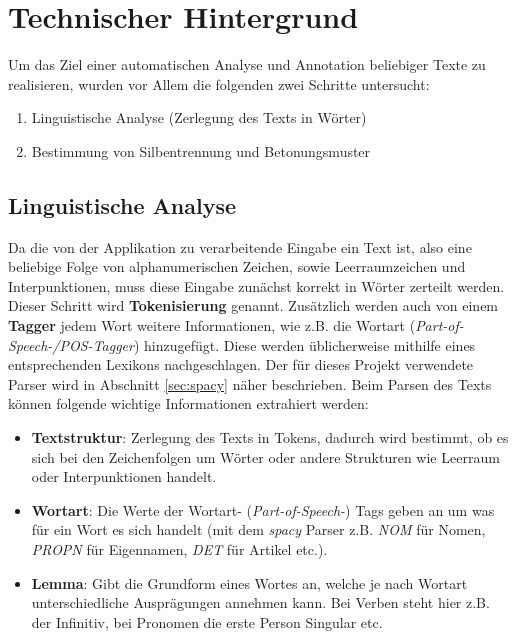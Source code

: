 \section{Technischer Hintergrund}

Um das Ziel einer automatischen Analyse und Annotation beliebiger Texte zu realisieren, wurden vor Allem die folgenden zwei Schritte untersucht:
\begin{enumerate}
	\item Linguistische Analyse (Zerlegung des Texts in Wörter)
	\item Bestimmung von Silbentrennung und Betonungsmuster
\end{enumerate}

\subsection{Linguistische Analyse}
Da die von der Applikation zu verarbeitende Eingabe ein Text ist, also eine beliebige Folge von alphanumerischen Zeichen, sowie Leerraumzeichen und Interpunktionen, muss diese Eingabe zunächst korrekt in Wörter zerteilt werden. Dieser Schritt wird \textbf{Tokenisierung} genannt. Zusätzlich werden auch von einem \textbf{Tagger} jedem Wort weitere Informationen, wie z.B. die Wortart (\textit{Part-of-Speech-/POS-Tagger}) hinzugefügt. Diese werden üblicherweise mithilfe eines entsprechenden Lexikons nachgeschlagen\cite{Carstensen2004}. Der für dieses Projekt verwendete Parser wird in Abschnitt \ref{sec:spacy} näher beschrieben. Beim Parsen des Texts können folgende wichtige Informationen extrahiert werden:

\begin{itemize}
	\item \textbf{Textstruktur}: Zerlegung des Texts in Tokens, dadurch wird bestimmt, ob es sich bei den Zeichenfolgen um Wörter oder andere Strukturen wie Leerraum oder Interpunktionen handelt.
	
	\item \textbf{Wortart}: Die Werte der Wortart- (\textit{Part-of-Speech-}) Tags geben an um was für ein Wort es sich handelt (mit dem \textit{spacy} Parser z.B. \textit{NOM} für Nomen, \textit{PROPN} für Eigennamen, \textit{DET} für Artikel etc.).
	\item  \textbf{Lemma}: Gibt die Grundform eines Wortes an, welche je nach Wortart unterschiedliche Ausprägungen annehmen kann. Bei Verben steht hier z.B. der Infinitiv, bei Pronomen die erste Person Singular etc.
\end{itemize}

